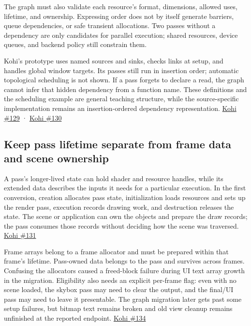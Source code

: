 The graph must also validate each resource's format, dimensions, allowed uses, lifetime, and ownership. Expressing order does not by itself generate barriers, queue dependencies, or safe transient allocations. Two passes without a dependency are only candidates for parallel execution; shared resources, device queues, and backend policy still constrain them.

Kohi's prototype uses named sources and sinks, checks links at setup, and handles global window targets. Its passes still run in insertion order; automatic topological scheduling is not shown. If a pass forgets to declare a read, the graph cannot infer that hidden dependency from a function name. These definitions and the scheduling example are general teaching structure, while the source-specific implementation remains an insertion-ordered dependency representation. \href{https://www.youtube.com/watch?v=oPvx_v1RGvs}{Kohi \#129} · \href{https://www.youtube.com/watch?v=zxB7Ug95G08}{Kohi \#130}

\subsection{Keep pass lifetime separate from frame data and scene ownership}\label{06-engine-ii-ch026-keep-pass-lifetime-separate-from-frame-data-and-scene-ownership}

\hypertarget{06-engine-ii-ch026-keep-pass-lifetime-separate-from-frame-data-and-scene-ownership}{}

A pass's longer-lived state can hold shader and resource handles, while its extended data describes the inputs it needs for a particular execution. In the first conversion, creation allocates pass state, initialization loads resources and sets up the render pass, execution records drawing work, and destruction releases the state. The scene or application can own the objects and prepare the draw records; the pass consumes those records without deciding how the scene was traversed. \href{https://www.youtube.com/watch?v=lFl_jtkfEDg}{Kohi \#131}

Frame arrays belong to a frame allocator and must be prepared within that frame's lifetime. Pass-owned data belongs to the pass and survives across frames. Confusing the allocators caused a freed-block failure during UI text array growth in the migration. Eligibility also needs an explicit per-frame flag: even with no scene loaded, the skybox pass may need to clear the output, and the final/UI pass may need to leave it presentable. The graph migration later gets past some setup failures, but bitmap text remains broken and old view cleanup remains unfinished at the reported endpoint. \href{https://www.youtube.com/watch?v=AR6c1Bn57G4}{Kohi \#134}

